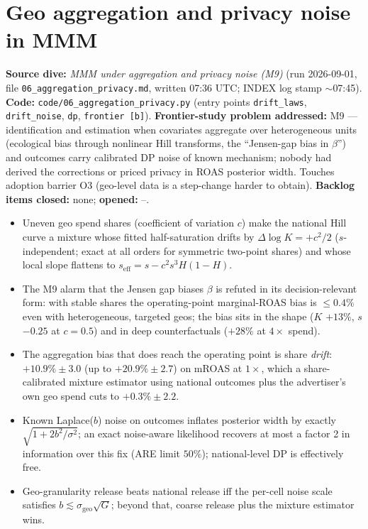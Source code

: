 \chapter{Geo aggregation and privacy noise in MMM}
\label{ch:aggregation}

\begin{provenance}
\textbf{Source dive:}  \emph{MMM under aggregation and privacy noise (M9)} (run 2026-09-01, file \texttt{06\_aggregation\_privacy.md}, written 07:36 UTC; INDEX log stamp $\sim$07:45).
\textbf{Code:} \texttt{code/06\_aggregation\_privacy.py} (entry points \texttt{drift\_laws}, \texttt{drift\_noise}, \texttt{dp}, \texttt{frontier [b]}).
\textbf{Frontier-study problem addressed:} M9 --- identification and estimation when covariates aggregate over heterogeneous units (ecological bias through nonlinear Hill transforms, the ``Jensen-gap bias in $\beta$'') and outcomes carry calibrated DP noise of known mechanism; nobody had derived the corrections or priced privacy in ROAS posterior width. Touches adoption barrier O3 (geo-level data is a step-change harder to obtain).
\textbf{Backlog items closed:} none; \textbf{opened:} --.
\end{provenance}

\begin{keyideas}
\begin{itemize}
\item Uneven geo spend shares (coefficient of variation $c$) make the national Hill curve a mixture whose fitted half-saturation drifts by $\Delta\log K = +c^2/2$ ($s$-independent; exact at all orders for symmetric two-point shares) and whose local slope flattens to $s_{\mathrm{eff}} = s - c^2 s^3 H(1-H)$.
\item The M9 alarm that the Jensen gap biases $\beta$ is refuted in its decision-relevant form: with stable shares the operating-point marginal-ROAS bias is $\le 0.4\%$ even with heterogeneous, targeted geos; the bias sits in the shape ($K$ $+13\%$, $s$ $-0.25$ at $c = 0.5$) and in deep counterfactuals ($+28\%$ at $4\times$ spend).
\item The aggregation bias that does reach the operating point is share \emph{drift}: $+10.9\% \pm 3.0$ (up to $+20.9\% \pm 2.7$) on mROAS at $1\times$, which a share-calibrated mixture estimator using national outcomes plus the advertiser's own geo spend cuts to $+0.3\% \pm 2.2$.
\item Known Laplace($b$) noise on outcomes inflates posterior width by exactly $\sqrt{1 + 2b^2/\sigma^2}$; an exact noise-aware likelihood recovers at most a factor 2 in information over this fix (ARE limit $50\%$); national-level DP is effectively free.
\item Geo-granularity release beats national release iff the per-cell noise scale satisfies $b \lesssim \sigma_{\mathrm{geo}}\sqrt{G}$; beyond that, coarse release plus the mixture estimator wins.
\end{itemize}
\end{keyideas}

